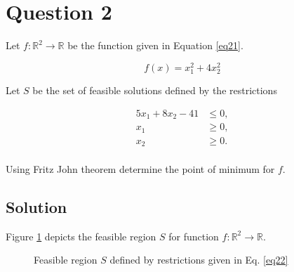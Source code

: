 
\section*{Question 2}

Let $f : \mathbb{R}^2 \rightarrow \mathbb{R}$ be the function given in Equation \ref{eq21}.

\begin{equation}
f(x) = x_1^2 + 4x_2^2
\label{eq21}
\end{equation}

Let $S$ be the set of feasible solutions defined by the restrictions

\begin{equation}
\begin{aligned}
5x_1 + 8x_2 - 41 &\leqslant 0,\\
x_1 &\geqslant 0,\\
x_2 &\geqslant 0.\\
\end{aligned}
\label{eq22}
\end{equation}

Using Fritz John theorem determine the point of minimum for $f$.

\subsection*{Solution}

Figure \ref{fig21} depicts the feasible region $S$ for function $f: \mathbb{R}^2 \rightarrow \mathbb{R}$.

\begin{figure}[H]\centering
{}
\caption{Feasible region $S$ defined by restrictions given in Eq. \ref{eq22}}\label{fig21}
\end{figure}

